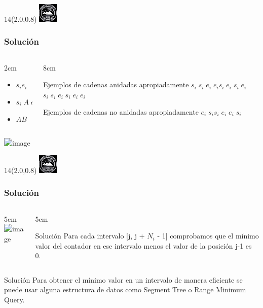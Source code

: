 \documentclass[10pt,xcolor=tables,{dvipsnames}]{beamer}
\newcommand{\MyLogo}{%
	\begin{textblock}{14}(2.0,0.8)
		\includegraphics[height=0.925cm, angle=0]{UOWhite}
	\end{textblock}
}
\begin{document}
       

        \begin{frame}
           	\MyLogo
           	\frametitle{Solución}
       \begin{columns}
       	\begin{column}{2cm}
			  \begin{itemize}
			  	\item $s_ie_i$
			  	\item $s_i\;A\;e_i$
			  	\item $AB$
			  \end{itemize}
       	\end{column}
       	\begin{column}{8cm}
       	\begin{block}{Ejemplos de cadenas anidadas apropiadamente}
       	       $s_i \; s_i \; e_i \; e_i $\hspace{1cm}$s_i \; e_i \; s_i \; e_i$\hspace{1cm}$s_i \; s_i \; e_i \; s_i \; e_i \; e_i$
         \end{block}
	     \begin{block}{Ejemplos de cadenas no anidadas apropiadamente}
               $e_i \; s_i $\hspace{1cm}$s_i \; e_i \; e_i \; s_i$
         \end{block}
       	       	
       	\end{column}

       \end{columns}
		\begin{center}
        	 \includegraphics<1->[scale=0.65]{Contador}
		\end{center}
       \end{frame}
       
              \begin{frame}
               	\MyLogo
               	\frametitle{Solución}
               	\begin{columns}
                      \begin{column}{5cm}
               		\includegraphics<1->[scale=0.5]{CadenaDuplicada}
                      \end{column}      
                      \begin{column}{5cm}
            \begin{block}{Solución}
            	Para cada intervalo [j, j + $N_i$ - 1]  comprobamos que el mínimo valor del contador en ese intervalo menos el valor de la posición j-1 es 0. 
            \end{block}                      
            \end{column}      
               	\end{columns}
            \begin{block}{Solución}
            Para obtener el mínimo valor en un intervalo de manera eficiente se puede usar alguna estructura de
            	datos como Segment Tree o Range Minimum Query. 
            \end{block}
               \end{frame}
\end{document}
